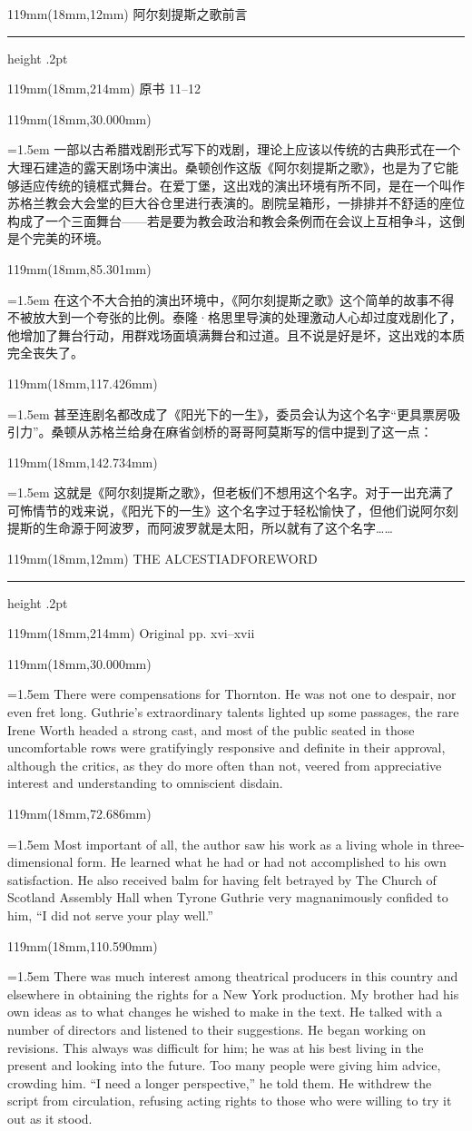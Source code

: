 \documentclass{article}
\newcommand{\ENsetup}{\normalfont\color{ink}\fontsize{11}{16.5}\selectfont\emergencystretch=1.5em}
\newcommand{\ZHsetup}{\normalfont\color{ink}\fontsize{10.5}{17}\selectfont\emergencystretch=1.5em}
\newcommand{\Block}[3]{\begin{textblock*}{119mm}(18mm,#1mm){#2 #3\par}\end{textblock*}}
\newcommand{\Heading}[3]{%
  \begin{textblock*}{119mm}(18mm,12mm)
    \color{quiet}\fontsize{7.5}{10}\selectfont
    #1\hfill #2\par\vspace{3mm}\hrule height .2pt
  \end{textblock*}
  \begin{textblock*}{119mm}(18mm,214mm)
    \color{quiet}\fontsize{7}{10}\selectfont #3\hfill\thepage
  \end{textblock*}
}
\begin{document}
\newpage
\null
\Heading{阿尔刻提斯之歌}{前言}{原书 11–12}
\Block{30.000}{\ZHsetup}{一部以古希腊戏剧形式写下的戏剧，理论上应该以传统的古典形式在一个大理石建造的露天剧场中演出。桑顿创作这版《阿尔刻提斯之歌》，也是为了它能够适应传统的镜框式舞台。在爱丁堡，这出戏的演出环境有所不同，是在一个叫作苏格兰教会大会堂的巨大谷仓里进行表演的。剧院呈箱形，一排排并不舒适的座位构成了一个三面舞台——若是要为教会政治和教会条例而在会议上互相争斗，这倒是个完美的环境。\par }
\Block{85.301}{\ZHsetup}{在这个不大合拍的演出环境中，《阿尔刻提斯之歌》这个简单的故事不得不被放大到一个夸张的比例。泰隆·格思里导演的处理激动人心却过度戏剧化了，他增加了舞台行动，用群戏场面填满舞台和过道。且不说是好是坏，这出戏的本质完全丧失了。\par }
\Block{117.426}{\ZHsetup}{甚至连剧名都改成了《阳光下的一生》，委员会认为这个名字“更具票房吸引力”。桑顿从苏格兰给身在麻省剑桥的哥哥阿莫斯写的信中提到了这一点：\par }
\Block{142.734}{\ZHsetup}{\leftskip=4mm\rightskip=3mm\kai 这就是《阿尔刻提斯之歌》，但老板们不想用这个名字。对于一出充满了可怖情节的戏来说，《阳光下的一生》这个名字过于轻松愉快了，但他们说阿尔刻提斯的生命源于阿波罗，而阿波罗就是太阳，所以就有了这个名字……\par }
\newpage
\null
\Heading{THE ALCESTIAD}{FOREWORD}{Original pp. xvi–xvii}
\Block{30.000}{\ENsetup}{There were compensations for Thornton. He was not one to despair, nor even fret long. Guthrie's extraordinary talents lighted up some passages, the rare Irene Worth headed a strong cast, and most of the public seated in those uncomfortable rows were gratifyingly responsive and definite in their approval, although the critics, as they do more often than not, veered from appreciative interest and understanding to omniscient disdain.\par}
\Block{72.686}{\ENsetup}{Most important of all, the author saw his work as a living whole in three-dimensional form. He learned what he had or had not accomplished to his own satisfaction. He also received balm for having felt betrayed by The Church of Scotland Assembly Hall when Tyrone Guthrie very magnanimously confided to him, ``I did not serve your play well.''\par}
\Block{110.590}{\ENsetup}{There was much interest among theatrical producers in this country and elsewhere in obtaining the rights for a New York production. My brother had his own ideas as to what changes he wished to make in the text. He talked with a number of directors and listened to their suggestions. He began working on revisions. This always was difficult for him; he was at his best living in the present and looking into the future. Too many people were giving him advice, crowding him. ``I need a longer perspective,'' he told them. He withdrew the script from circulation, refusing acting rights to those who were willing to try it out as it stood.\par}
\end{document}
